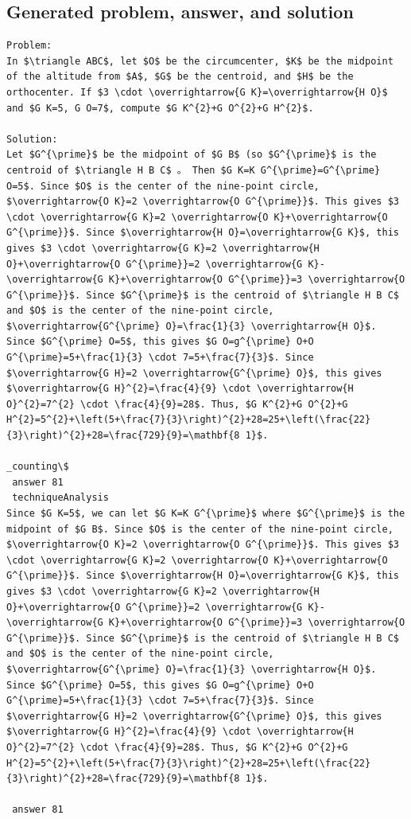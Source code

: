 \documentclass[11pt]{article}
\begin{document}
\subsection*{Generated problem, answer, and solution}
\begin{Verbatim}[breaklines=true,breakanywhere=true,fontsize=\small]
Problem:
In $\triangle ABC$, let $O$ be the circumcenter, $K$ be the midpoint of the altitude from $A$, $G$ be the centroid, and $H$ be the orthocenter. If $3 \cdot \overrightarrow{G K}=\overrightarrow{H O}$ and $G K=5, G O=7$, compute $G K^{2}+G O^{2}+G H^{2}$.

Solution:
Let $G^{\prime}$ be the midpoint of $G B$ (so $G^{\prime}$ is the centroid of $\triangle H B C$ 。 Then $G K=K G^{\prime}=G^{\prime} O=5$. Since $O$ is the center of the nine-point circle, $\overrightarrow{O K}=2 \overrightarrow{O G^{\prime}}$. This gives $3 \cdot \overrightarrow{G K}=2 \overrightarrow{O K}+\overrightarrow{O G^{\prime}}$. Since $\overrightarrow{H O}=\overrightarrow{G K}$, this gives $3 \cdot \overrightarrow{G K}=2 \overrightarrow{H O}+\overrightarrow{O G^{\prime}}=2 \overrightarrow{G K}-\overrightarrow{G K}+\overrightarrow{O G^{\prime}}=3 \overrightarrow{O G^{\prime}}$. Since $G^{\prime}$ is the centroid of $\triangle H B C$ and $O$ is the center of the nine-point circle, $\overrightarrow{G^{\prime} O}=\frac{1}{3} \overrightarrow{H O}$. Since $G^{\prime} O=5$, this gives $G O=g^{\prime} O+O G^{\prime}=5+\frac{1}{3} \cdot 7=5+\frac{7}{3}$. Since $\overrightarrow{G H}=2 \overrightarrow{G^{\prime} O}$, this gives $\overrightarrow{G H}^{2}=\frac{4}{9} \cdot \overrightarrow{H O}^{2}=7^{2} \cdot \frac{4}{9}=28$. Thus, $G K^{2}+G O^{2}+G H^{2}=5^{2}+\left(5+\frac{7}{3}\right)^{2}+28=25+\left(\frac{22}{3}\right)^{2}+28=\frac{729}{9}=\mathbf{8 1}$.

_counting\$
 answer 81
 techniqueAnalysis
Since $G K=5$, we can let $G K=K G^{\prime}$ where $G^{\prime}$ is the midpoint of $G B$. Since $O$ is the center of the nine-point circle, $\overrightarrow{O K}=2 \overrightarrow{O G^{\prime}}$. This gives $3 \cdot \overrightarrow{G K}=2 \overrightarrow{O K}+\overrightarrow{O G^{\prime}}$. Since $\overrightarrow{H O}=\overrightarrow{G K}$, this gives $3 \cdot \overrightarrow{G K}=2 \overrightarrow{H O}+\overrightarrow{O G^{\prime}}=2 \overrightarrow{G K}-\overrightarrow{G K}+\overrightarrow{O G^{\prime}}=3 \overrightarrow{O G^{\prime}}$. Since $G^{\prime}$ is the centroid of $\triangle H B C$ and $O$ is the center of the nine-point circle, $\overrightarrow{G^{\prime} O}=\frac{1}{3} \overrightarrow{H O}$. Since $G^{\prime} O=5$, this gives $G O=g^{\prime} O+O G^{\prime}=5+\frac{1}{3} \cdot 7=5+\frac{7}{3}$. Since $\overrightarrow{G H}=2 \overrightarrow{G^{\prime} O}$, this gives $\overrightarrow{G H}^{2}=\frac{4}{9} \cdot \overrightarrow{H O}^{2}=7^{2} \cdot \frac{4}{9}=28$. Thus, $G K^{2}+G O^{2}+G H^{2}=5^{2}+\left(5+\frac{7}{3}\right)^{2}+28=25+\left(\frac{22}{3}\right)^{2}+28=\frac{729}{9}=\mathbf{8 1}$.

 answer 81
\end{Verbatim}
\clearpage
\end{document}

